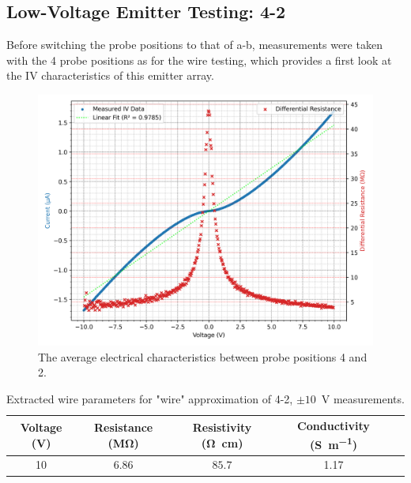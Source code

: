 \begin{refsection}
\subsection{Low-Voltage Emitter Testing: 4-2}
Before switching the probe positions to that of a-b, measurements were taken with the 4 probe positions as for the wire testing, which provides a first look at the IV characteristics of this emitter array.
\begin{figure}[H]
    \centering
    \includegraphics[width=\linewidth]{Chapter7/Figs/Raster/Emitters/42 3x 10V.png}
    \caption{The average electrical characteristics between probe positions 4 and 2.}
    \label{fig:e_42_10v}
\end{figure}

\begin{table}[h!]
\centering
\begin{tabular}{|c|c|c|c|c|}
\hline
\textbf{Voltage (V)} & \textbf{Resistance (\si{\mega\ohm})}  & \textbf{Resistivity (\si{\ohm\centi\metre})} & \textbf{Conductivity (\si{\siemens\per\metre})} \\
\hline
10 & $6.86$ & $85.7$ & 1.17 \\
\hline
\end{tabular}
\caption{Extracted wire parameters for "wire" approximation of 4-2, $\pm10$~\si{\volt} measurements.}
\label{tab:42_e_wire_parameters_10v}
\end{table}


\end{refsection}

